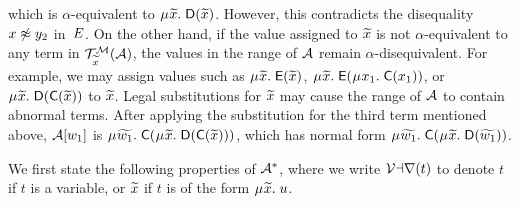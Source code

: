 \begin{examplex}
which is $\alpha$-equivalent to $\MU {\Varec{x}}.\; \const{D}( {\Varec{x}} )$.
However, this contradicts the disequality $x \not\approx y_2$ in~$E$.
On the other hand, if the value assigned to ${\widetilde{x}}$ is not $\alpha$-equivalent to any term in $\mathcal{T}^{\mathcal{M}}_{{\widetilde{x}}}( \mathcal{A} )$,
the values in the range of $\mathcal{A}$ remain $\alpha$-disequivalent.
For example, we may assign values such as 
$\MU {\Varec{x}}.\; \const{E}( {\Varec{x}} )$,
$\MU {\Varec{x}}.\; \const{E}( \MU x_1.\; \const{C}( x_1) )$, or
$\MU {\Varec{x}}.\; \const{D}( \const{C}( {\Varec{x}} ) )$
to ${\widetilde{x}}$.
Legal substitutions for ${\widetilde{x}}$ may cause the range of $\mathcal{A}$ to contain abnormal terms.
After applying the substitution for the third term mentioned above,
$\mathcal{A} [w_1]$ is $\MU {\Varec{w_1}}.\; \const{C}( \MU {\Varec{x}}.\; \const{D}( \const{C}( {\Varec{x}} ) ) )$,
which has normal form
$\MU {\Varec{w_1}}.\; \const{C}( \MU {\Varec{x}}.\; \const{D}( {\Varec{w_1}} ) )$.
\xend
\end{examplex}

We first state the following properties of $\mathcal{A}^\ast$,
where we write $\mathcal{Var}( t )$ to denote $t$ if $t$ is a variable, or ${\widetilde{x}}$ if $t$ is of the form $\MU {\Varec{x}}.\; u$.


